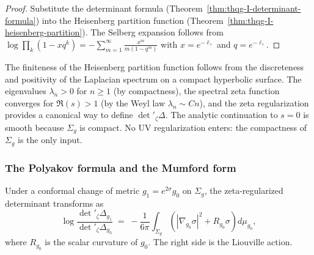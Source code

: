 \begin{proof}
Substitute the determinant formula (Theorem~\ref{thm:thqg-I-determinant-formula}) into the Heisenberg partition function (Theorem~\ref{thm:thqg-I-heisenberg-partition}). The Selberg expansion follows from $\log\prod_k (1-x q^k) = -\sum_{m=1}^\infty \frac{x^m}{m(1-q^m)}$ with $x = e^{-\ell_\gamma}$ and $q = e^{-\ell_\gamma}$.
\end{proof}

\begin{remark}
\label{rem:thqg-I-spectral-geometric}
The finiteness of the Heisenberg partition function follows from the discreteness and positivity of the Laplacian spectrum on a compact hyperbolic surface. The eigenvalues $\lambda_n > 0$ for $n \geq 1$ (by compactness), the spectral zeta function converges for $\Re(s) > 1$ (by the Weyl law $\lambda_n \sim Cn$), and the zeta regularization provides a canonical way to define $\det{}'_\zeta\Delta$. The analytic continuation to $s = 0$ is smooth because $\Sigma_g$ is compact. No UV regularization enters: the compactness of $\Sigma_g$ is the only input.
\end{remark}

\subsubsection{The Polyakov formula and the Mumford form}

\begin{proposition}
\label{prop:thqg-I-polyakov}
Under a conformal change of metric $g_1 = e^{2\sigma} g_0$ on $\Sigma_g$, the zeta-regularized determinant transforms as
\begin{equation}\label{eq:thqg-I-polyakov}
\log\frac{\det{}'_\zeta \Delta_{g_1}}{\det{}'_\zeta \Delta_{g_0}} \;=\; -\frac{1}{6\pi}\int_{\Sigma_g}\left( |\nabla_{g_0}\sigma|^2 + R_{g_0}\sigma \right) d\mu_{g_0},
\end{equation}
where $R_{g_0}$ is the scalar curvature of $g_0$. The right side is the Liouville action.
\end{proposition}

